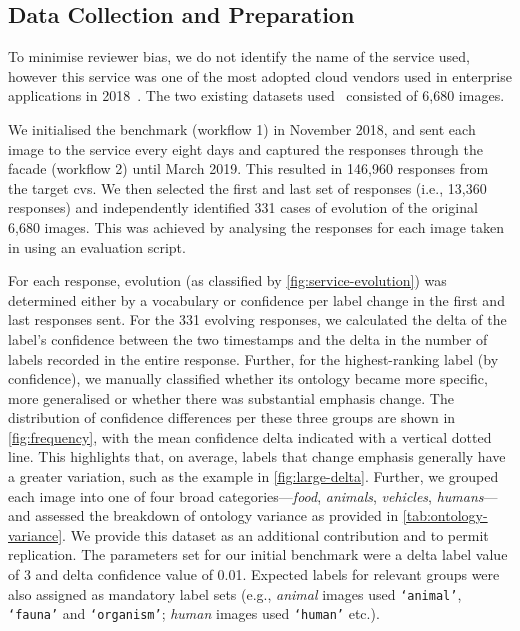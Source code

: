 \subsection{Data Collection and Preparation}

To minimise reviewer bias, we do not identify the name of the service used, however this service was one of the most adopted cloud vendors used in enterprise applications in 2018~\citep{RightScaleInc:2018kJ}. The two existing datasets used~\citep{Cummaudo:2019icsme,Lin:2014vma} consisted of 6,680 images. 

We initialised the benchmark (workflow 1) in November 2018, and sent each image to the service every eight days and captured the  responses through the facade  (workflow 2) until March 2019. This resulted in 146,960  responses from the target \gls{cvs}. We then selected the first and last set of  responses (i.e., 13,360 responses) and independently identified 331 cases of evolution of the original 6,680 images.  This was achieved by analysing the  responses for each image taken in using an evaluation script.

For each  response, evolution (as classified by \cref{fig:service-evolution}) was determined either by a vocabulary or confidence per label change in the first and last responses sent. For the 331 evolving responses, we calculated the delta of the label's confidence between the two timestamps and the delta in the number of labels recorded in the entire response. Further, for the highest-ranking label (by confidence), we manually classified whether its ontology became more specific, more generalised or whether there was substantial emphasis change. The distribution of confidence differences per these three groups are shown in \cref{fig:frequency}, with the mean confidence delta indicated with a vertical dotted line. This highlights that, on average, labels that change emphasis generally have a greater variation, such as the example in \cref{fig:large-delta}. Further, we grouped each image into one of four broad categories---\textit{food}, \textit{animals}, \textit{vehicles}, \textit{humans}---and assessed the breakdown of ontology variance as provided in \cref{tab:ontology-variance}. We provide this dataset as an additional contribution and to permit replication.
The parameters set for our initial benchmark were a delta label value of 3 and delta confidence value of 0.01. Expected labels for relevant groups were also assigned as mandatory label sets (e.g., \textit{animal} images used \texttt{`animal'}, \texttt{`fauna'} and \texttt{`organism'}; \textit{human} images used \texttt{`human'} etc.).


